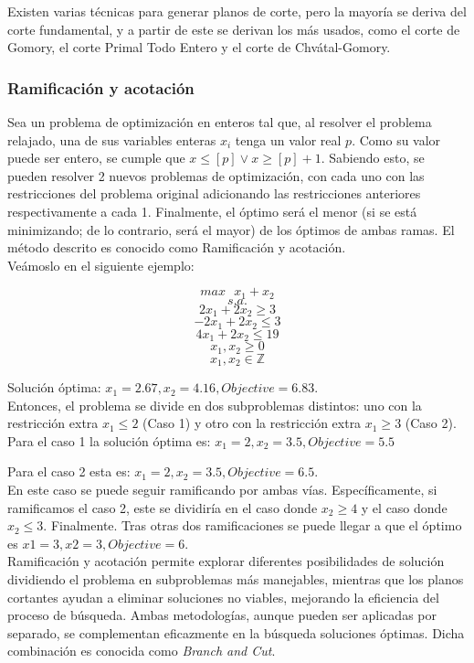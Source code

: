 \documentclass[runningheads]{llncs}
\begin{document}
Existen varias técnicas para generar planos de corte, pero la mayoría se deriva del corte fundamental, y a partir de este se derivan los más usados, como el corte de Gomory, el corte Primal Todo Entero y el corte  de Chvátal-Gomory.\\


\subsubsection{Ramificación y acotación\\}

Sea un problema de optimización en enteros tal que, al resolver el problema relajado, una de sus variables enteras $x_i$ tenga un valor real $p$. Como su valor puede ser entero, se cumple que $x \leq  [p] \lor  x \geq  [p]+1$. Sabiendo esto, se pueden resolver 2 nuevos problemas de optimización, con cada uno con las restricciones del problema original adicionando las restricciones anteriores respectivamente a cada 1. Finalmente, el óptimo será el menor (si se está minimizando; de lo contrario, será el mayor) de los óptimos de ambas ramas. El método descrito es conocido como Ramificación y acotación. \\

Veámoslo en el siguiente ejemplo:

$$max \text{ } x_1 + x_2$$
$$s.a.$$
$$2x_1 + 2x_2 \geq  3$$
$$-2x_1 + 2x_2 \leq  3$$
$$4x_1 + 2x_2 \leq  19$$
$$x_1, x_2 \geq  0$$
$$x_1, x_2 \in \mathbb{Z}$$

Solución óptima: $x_1=2.67, x_2=4.16, Objective=6.83$.\\

Entonces, el problema se divide en dos subproblemas distintos: uno con la restricción extra $x_1\leq 2$ (Caso 1) y otro con la restricción extra $x_1\geq 3$ (Caso 2).\\

Para el caso 1 la solución óptima es: $x_1=2, x_2=3.5, Objective=5.5$

Para el caso 2 esta es: $x_1=2, x_2=3.5, Objective=6.5$.\\

En este caso se puede seguir ramificando por ambas vías. Específicamente, si ramificamos el caso 2, este se dividiría en el caso donde $x_2\geq 4$ y el caso donde $x_2\leq 3$. Finalmente. Tras otras dos ramificaciones se puede llegar a que el óptimo es $x1=3, x2=3, Objective=6$.\\

Ramificación y acotación permite explorar diferentes posibilidades de solución dividiendo el problema en subproblemas más manejables, mientras que los planos cortantes ayudan a eliminar soluciones no viables, mejorando la eficiencia del proceso de búsqueda. Ambas metodologías, aunque pueden ser aplicadas por separado, se complementan eficazmente en la búsqueda soluciones óptimas. Dicha combinación es conocida como \textit{Branch and Cut}. 
\end{document}
